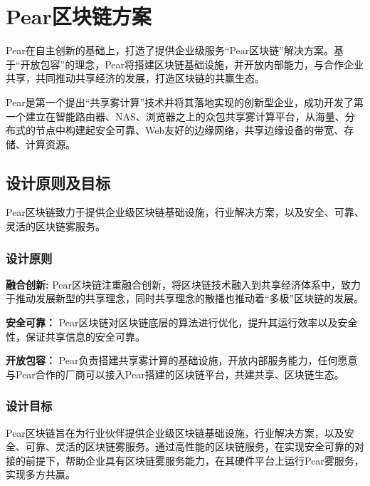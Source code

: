 \chapter{Pear区块链方案}

Pear在自主创新的基础上，打造了提供企业级服务“Pear区块链”解决方案。基于“开放包容”的理念，Pear将搭建区块链基础设施，并开放内部能力，与合作企业共享，共同推动共享经济的发展，打造区块链的共赢生态。\par 
Pear是第一个提出“共享雾计算”技术并将其落地实现的创新型企业，成功开发了第一个建立在智能路由器、NAS、浏览器之上的众包共享雾计算平台，从海量、分布式的节点中构建起安全可靠、Web友好的边缘网络，共享边缘设备的带宽、存储、计算资源。
\section{设计原则及目标}
Pear区块链致力于提供企业级区块链基础设施，行业解决方案，以及安全、可靠、灵活的区块链雾服务。
\subsection{设计原则}
\textbf{融合创新:}  Pear区块链注重融合创新，将区块链技术融入到共享经济体系中，致力于推动发展新型的共享理念，同时共享理念的散播也推动着“多极”区块链的发展。\par 
\textbf{安全可靠：} Pear区块链对区块链底层的算法进行优化，提升其运行效率以及安全性，保证共享信息的安全可靠。\par 
\textbf{开放包容：}
Pear负责搭建共享雾计算的基础设施，开放内部服务能力，任何愿意与Pear合作的厂商可以接入Pear搭建的区块链平台，共建共享、区块链生态。

\subsection{设计目标}
Pear区块链旨在为行业伙伴提供企业级区块链基础设施，行业解决方案，以及安全、可靠、灵活的区块链雾服务。通过高性能的区块链服务，在实现安全可靠的对接的前提下，帮助企业具有区块链雾服务能力，在其硬件平台上运行Pear雾服务，实现多方共赢。

